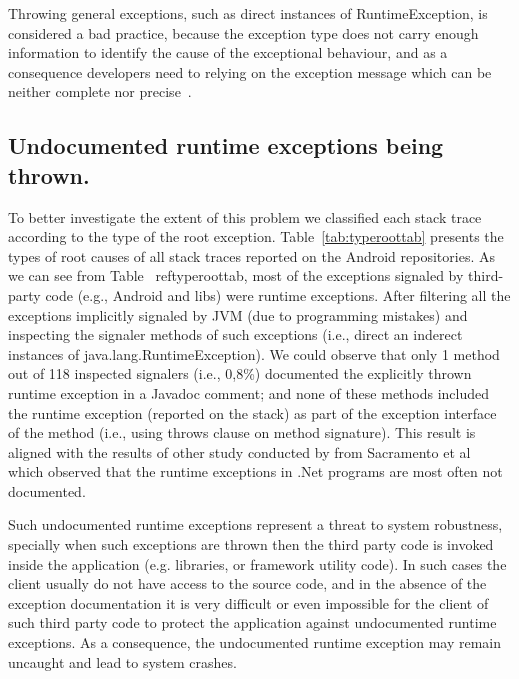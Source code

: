 \documentclass[conference]{IEEEtran}
\begin{document}
Throwing general exceptions, such as direct instances of RuntimeException, is  considered a
bad practice, because the exception type does not carry enough information to identify the
cause of the exceptional behaviour, and as a consequence developers need to relying on
the exception message which can be neither complete nor precise~\cite{gosling2000java}.


\subsection{Undocumented runtime exceptions being thrown.}

To better investigate the extent of this problem we classified each stack trace according to the type of the
root exception. Table~\ref{tab:typeroottab} presents the types of root causes of all stack traces reported on 
the Android repositories. As we can see from Table ~ref{typeroottab},  most of the exceptions signaled by third-party code
 (e.g., Android and libs) were runtime exceptions. After filtering all the exceptions implicitly signaled by 
JVM (due to programming mistakes) and inspecting the signaler methods of such exceptions (i.e.,  direct an inderect 
instances of java.lang.RuntimeException). We could observe that only 1 method out of 118 inspected signalers
 (i.e., 0,8\%) documented the explicitly thrown runtime exception in a Javadoc comment; and none of these methods
included the runtime exception  (reported on the stack) as part of the exception interface of the method (i.e., using 
throws clause on method signature). This result is aligned with the results of other  study conducted by from 
Sacramento et al ~\cite{sacramento2006unchecked} which observed that the
runtime exceptions in .Net programs are most often not documented.

Such undocumented runtime exceptions represent a threat to system robustness, specially
when such exceptions are thrown then the third party code is invoked inside the application (e.g. libraries, or framework utility code).
In such cases the client usually do not have access to the source code, and in the absence of
the exception documentation it is very difficult or even impossible for the client of such third party code to 
protect the application against undocumented runtime exceptions. As a consequence, the
 undocumented runtime exception may remain uncaught and lead to system crashes.
\end{document}
